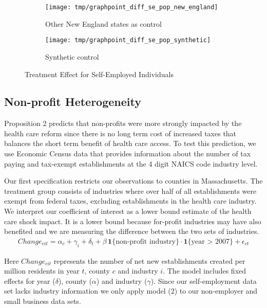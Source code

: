 \documentclass[12pt]{article}
\begin{document}
\begin{figure}[H]
	\centering
	\begin{subfigure}[b]{0.495\textwidth}
		\texttt{[image: tmp/graphpoint\_diff\_se\_pop\_new\_england]}
		\caption{Other New England states as control}
	\end{subfigure}
		\begin{subfigure}[b]{0.495\textwidth}
		\texttt{[image: tmp/graphpoint\_diff\_se\_pop\_synthetic]}
		\caption{Synthetic control}
	\end{subfigure}
	\caption{Treatment Effect for Self-Employed Individuals}
	\label{fig:state_contrast}
\end{figure}

\subsection{Non-profit Heterogeneity}

Proposition 2 predicts that non-profits were more strongly impacted by the health care reform since there is no long term cost of increased taxes that balances the short term benefit of health care access. To test this prediction, we use Economic Census data that provides information about the number of tax paying and tax-exempt establishments at the 4 digit NAICS code industry level.  

Our first specification restricts our observations to counties in Massachusetts. The treatment group consists of industries where over half of all establishments were exempt from federal taxes, excluding establishments in the health care industry. We interpret our coefficient of interest as a lower bound estimate of the health care shock impact. It is a lower bound because for-profit industries may have also benefited and we are measuring the difference between the two sets of industries.
\begin{align}
Change_{cit} = \alpha_c + \gamma_i + \delta_t + \beta \, \mathbf{1}\{\text{non-profit industry}\} \cdot \mathbf{1}\{\text{year > 2007}\} + \epsilon_{ct}
\end{align}

Here $Change_{cit}$ represents the number of net new establishments created per million residents in year $t$, county $c$ and industry $i$. The model includes fixed effects for year ($\delta$), county ($\alpha$) and industry ($\gamma$). Since our self-employment data set lacks industry information we only apply model (2) to our non-employer and small business data sets. 
\end{document}
